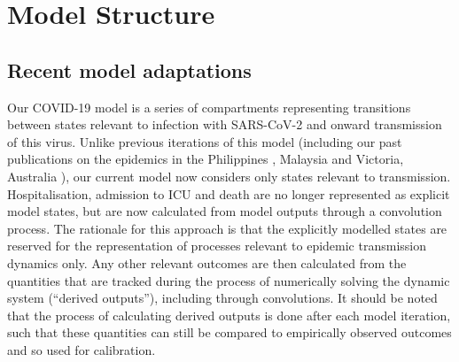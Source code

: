 
\section{Model Structure}

\subsection{Recent model adaptations}

Our COVID-19 model is a series of compartments representing transitions between states relevant to infection with SARS-CoV-2 and onward transmission of this virus.
Unlike previous iterations of this model 
(including our past publications on the epidemics in the Philippines 
\cite{caldwell-2021-a}, Malaysia \cite{jayasundara-2021} and Victoria, Australia \cite{trauer-2021-a}), 
our current model now considers only states relevant to transmission.
Hospitalisation, admission to ICU and death are no longer represented as explicit model states, 
but are now calculated from model outputs through a convolution process.
The rationale for this approach is that the explicitly modelled states 
are reserved for the representation of processes relevant to epidemic transmission dynamics only.
Any other relevant outcomes are then calculated 
from the quantities that are tracked during the process of numerically solving the dynamic system (``derived outputs''), 
including through convolutions.
It should be noted that the process of calculating derived outputs 
is done after each model iteration, 
such that these quantities can still be compared to empirically observed outcomes 
and so used for calibration.

